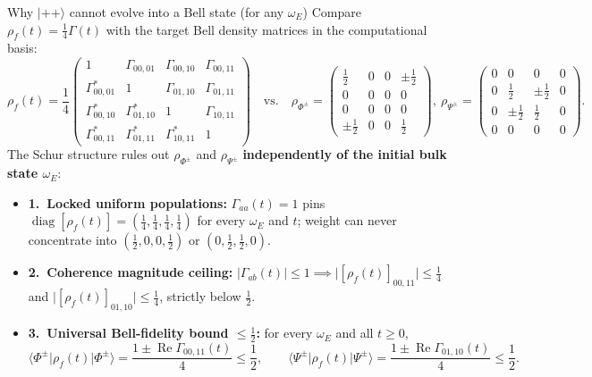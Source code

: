 \documentclass[aspectratio=169,11pt]{beamer}
\newcommand{\ket}[1]{\lvert #1\rangle}
\newcommand{\bra}[1]{\langle #1\rvert}
\newcommand{\diag}{\operatorname{diag}}
\begin{document}
\begin{frame}{Why $\ket{++}$ cannot evolve into a Bell state (for any $\omega_E$)}
\small
Compare $\rho_f(t)=\tfrac14\Gamma(t)$ with the target Bell density matrices in the computational basis:
{\footnotesize\setlength\arraycolsep{3.5pt}
\[
\rho_f(t)=\frac14\begin{pmatrix}
1&\Gamma_{00,01}&\Gamma_{00,10}&\Gamma_{00,11}\\
\Gamma_{00,01}^*&1&\Gamma_{01,10}&\Gamma_{01,11}\\
\Gamma_{00,10}^*&\Gamma_{01,10}^*&1&\Gamma_{10,11}\\
\Gamma_{00,11}^*&\Gamma_{01,11}^*&\Gamma_{10,11}^*&1
\end{pmatrix}
\quad\text{vs.}\quad
\rho_{\Phi^\pm}=\begin{pmatrix}
\tfrac12&0&0&\pm\tfrac12\\0&0&0&0\\0&0&0&0\\\pm\tfrac12&0&0&\tfrac12
\end{pmatrix},\ 
\rho_{\Psi^\pm}=\begin{pmatrix}
0&0&0&0\\0&\tfrac12&\pm\tfrac12&0\\0&\pm\tfrac12&\tfrac12&0\\0&0&0&0
\end{pmatrix}.
\]}
The Schur structure rules out $\rho_{\Phi^\pm}$ and $\rho_{\Psi^\pm}$ \textbf{independently of the initial bulk state $\omega_E$}:
\begin{itemize}\setlength\itemsep{4pt}
\item \textbf{1.\ Locked uniform populations:} $\Gamma_{aa}(t)=1$ pins $\diag[\rho_f(t)]=(\tfrac14,\tfrac14,\tfrac14,\tfrac14)$ for every $\omega_E$ and $t$; weight can never concentrate into $(\tfrac12,0,0,\tfrac12)$ or $(0,\tfrac12,\tfrac12,0)$.
\item \textbf{2.\ Coherence magnitude ceiling:} $\lvert\Gamma_{ab}(t)\rvert\le1\implies\lvert[\rho_f(t)]_{00,11}\rvert\le\tfrac14$ and $\lvert[\rho_f(t)]_{01,10}\rvert\le\tfrac14$, strictly below $\tfrac12$.
\item \textbf{3.\ Universal Bell-fidelity bound $\le\tfrac12$:} for every $\omega_E$ and all $t\ge0$,
\[
\boxed{\bra{\Phi^\pm}\rho_f(t)\ket{\Phi^\pm}=\frac{1\pm\operatorname{Re}\Gamma_{00,11}(t)}{4}\le\frac12,\qquad
\bra{\Psi^\pm}\rho_f(t)\ket{\Psi^\pm}=\frac{1\pm\operatorname{Re}\Gamma_{01,10}(t)}{4}\le\frac12.}
\]
\end{itemize}
\end{frame}
\end{document}
